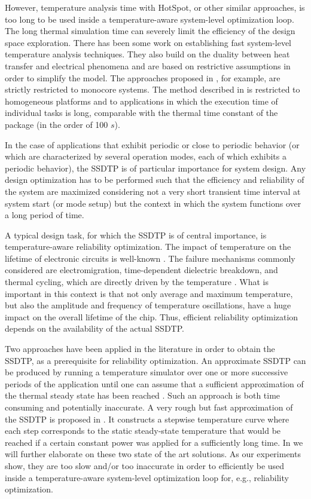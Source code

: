However, temperature analysis time with HotSpot, or other similar approaches, is
too long to be used inside a temperature-aware system-level optimization loop.
The long thermal simulation time can severely limit the efficiency of the design
space exploration. There has been some work on establishing fast system-level
temperature analysis techniques. They also build on the duality between heat
transfer and electrical phenomena and are based on restrictive assumptions in
order to simplify the model. The approaches proposed in \cite{rai2011, bao2010},
for example, are strictly restricted to monocore systems. The method described
in \cite{rao2009} is restricted to homogeneous platforms and to applications in
which the execution time of individual tasks is long, comparable with the
thermal time constant of the package (in the order of 100 $s$).

In the case of applications that exhibit periodic or close to periodic behavior
(or which are characterized by several operation modes, each of which exhibits a
periodic behavior), the SSDTP is of particular importance for system design. Any
design optimization has to be performed such that the efficiency and reliability
of the system are maximized considering not a very short transient time interval
at system start (or mode setup) but the context in which the system functions
over a long period of time.

A typical design task, for which the SSDTP is of central importance, is
temperature-aware reliability optimization. The impact of temperature on the
lifetime of electronic circuits is well-known \cite{srinivasan2004, coskun2006,
xiang2010, jedec2010}. The failure mechanisms commonly considered are
electromigration, time-dependent dielectric breakdown, and thermal cycling,
which are directly driven by the temperature \cite{jedec2010}. What is important
in this context is that not only average and maximum temperature, but also the
amplitude and frequency of temperature oscillations, have a huge impact on the
overall lifetime of the chip. Thus, efficient reliability optimization depends
on the availability of the actual SSDTP.

Two approaches have been applied in the literature in order to obtain the SSDTP,
as a prerequisite for reliability optimization. An approximate SSDTP can be
produced by running a temperature simulator over one or more successive periods
of the application until one can assume that a sufficient approximation of the
thermal steady state has been reached \cite{srinivasan2004}. Such an approach is
both time consuming and potentially inaccurate. A very rough but fast
approximation of the SSDTP is proposed in \cite{huang2009}. It constructs a
stepwise temperature curve where each step corresponds to the static
steady-state temperature that would be reached if a certain constant power was
applied for a sufficiently long time. In  we will further
elaborate on these two state of the art solutions. As our experiments show, they
are too slow and/or too inaccurate in order to efficiently be used inside a
temperature-aware system-level optimization loop for, e.g., reliability
optimization.

